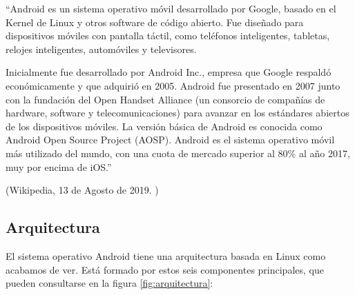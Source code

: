 ``Android es un sistema operativo móvil desarrollado por Google, basado en el Kernel de Linux y otros software de código abierto. Fue diseñado para dispositivos móviles con pantalla táctil, como teléfonos inteligentes, tabletas, relojes inteligentes, automóviles y televisores.

Inicialmente fue desarrollado por Android Inc., empresa que Google respaldó económicamente y que adquirió en 2005. Android fue presentado en 2007 junto con la fundación del Open Handset Alliance (un consorcio de compañías de hardware, software y telecomunicaciones) para avanzar en los estándares abiertos de los dispositivos móviles. La versión básica de Android es conocida como Android Open Source Project (AOSP). Android es el sistema operativo móvil más utilizado del mundo, con una cuota de mercado superior al 80\% al año 2017, muy por encima de iOS.''
\begin{flushright}
    (Wikipedia, 13 de Agosto de 2019. \cite{android_wikipedia})
\end{flushright}

\subsection{Arquitectura}
El sistema operativo Android tiene una arquitectura basada en Linux como acabamos de ver. Está formado por estos seis componentes principales, que pueden consultarse en la figura \ref{fig:arquitectura}\cite{arquitecturaAndroid}:

